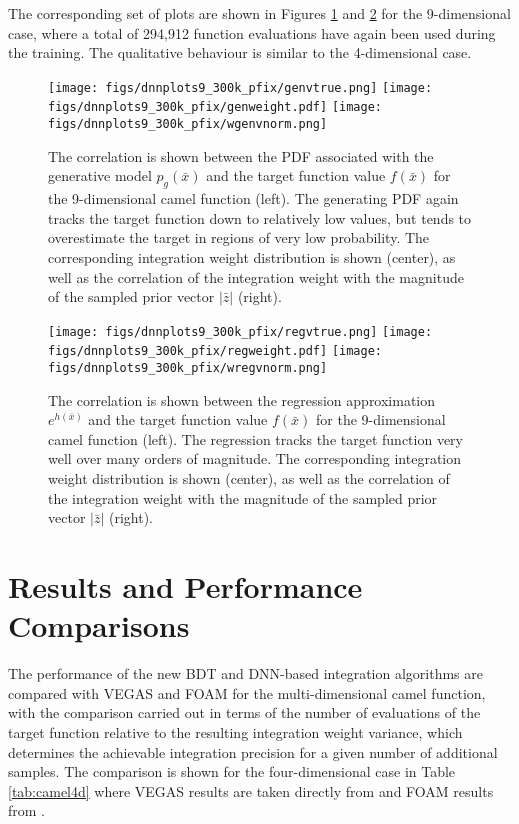 \documentclass[a4paper,11pt]{article}
\begin{document}
The corresponding set of plots are shown in Figures \ref{fig:9dgenweights} and \ref{fig:9dregweights} for the 9-dimensional case, where a total of 294,912 function evaluations have again been used during the training.  The qualitative behaviour is similar to the 4-dimensional case.

\begin{figure}[htb!]
 \texttt{[image: figs/dnnplots9\_300k\_pfix/genvtrue.png]}
 \texttt{[image: figs/dnnplots9\_300k\_pfix/genweight.pdf]}
 \texttt{[image: figs/dnnplots9\_300k\_pfix/wgenvnorm.png]}
 \caption{The correlation is shown between the PDF associated with the generative model $p_g(\bar x)$ and the target function value $f(\bar x)$ for the 9-dimensional camel function (left).  The generating PDF again tracks the target function down to relatively low values, but tends to overestimate the target in regions of very low probability.  The corresponding integration weight distribution is shown (center), as well as the correlation of the integration weight with the magnitude of the sampled prior vector $|\bar z|$ (right). }
 \label{fig:9dgenweights}
\end{figure}

\begin{figure}[htb!]
 \texttt{[image: figs/dnnplots9\_300k\_pfix/regvtrue.png]}
 \texttt{[image: figs/dnnplots9\_300k\_pfix/regweight.pdf]}
 \texttt{[image: figs/dnnplots9\_300k\_pfix/wregvnorm.png]}
 \caption{The correlation is shown between the regression approximation $e^{h(\bar x)}$ and the target function value $f(\bar x)$ for the 9-dimensional camel function (left).  The regression tracks the target function very well over many orders of magnitude.  The corresponding integration weight distribution is shown (center), as well as the correlation of the integration weight with the magnitude of the sampled prior vector $|\bar z|$ (right). }
 \label{fig:9dregweights}
\end{figure}


\section{Results and Performance Comparisons}

The performance of the new BDT and DNN-based integration algorithms are compared with VEGAS and FOAM for the multi-dimensional camel function, with the comparison carried out in terms of the number of evaluations of the target function relative to the resulting integration weight variance, which determines the achievable integration precision for a given number of additional samples.  The comparison is shown for the four-dimensional case in Table \ref{tab:camel4d} where VEGAS results are taken directly from \cite{vegas} and FOAM results from \cite{foam}.
\end{document}
